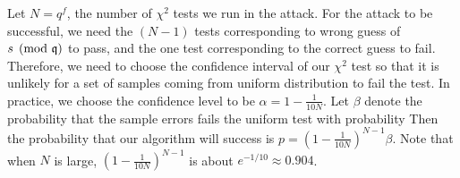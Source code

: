 \documentclass{amsart}
\begin{document}
Let $N = q^f$, the number of $\chi^2$ tests we run in the attack. For the attack to be successful, we need the $(N-1)$ tests corresponding to wrong guess of $s \pmod{\mathfrak{q}}$ to pass, and the one test corresponding to the correct guess to fail. Therefore, we need to choose the confidence interval of our $\chi^2$ test so that it is unlikely for a set of samples coming from uniform distribution to fail the test. In practice, we choose the confidence level to be  $\alpha = 1 - \frac{1}{10N}$. Let $\beta$ denote the probability that the sample errors fails the uniform test with probability  Then the probability that our algorithm will success is $p  = (1- \frac{1}{10N})^{N-1} \beta$. Note that when $N$ is large, $(1- \frac{1}{10N})^{N-1}$ is about $e^{-1/10} \approx 0.904$.








\end{document}
